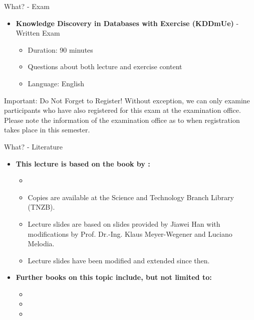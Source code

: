 \begin{frame}{What? - Exam}
	\begin{itemize}
		\item \textbf{Knowledge Discovery in Databases with Exercise (KDDmUe)} - {\color{faugray}Written Exam}
		      \begin{itemize}
			      \item Duration: 90 minutes
			      \item Questions about both lecture and exercise content
			      \item Language: English
		      \end{itemize}
	\end{itemize}
	\begin{alertblock}{Important: Do Not Forget to Register!}
		Without exception, we can only examine participants who have also registered for this exam at the examination office. Please note the information of the examination office as to when registration takes place in this semester.
	\end{alertblock}
\end{frame}

\begin{frame}{What? - Literature}
	\begin{itemize}
		\item \textbf{This lecture is based on the book by \citeauthor{han2011}:}
		      \begin{itemize}
			      \item {}
			      \item {\color{faugray}Copies are available at the Science and Technology Branch Library (TNZB).}
			      \item Lecture slides are based on slides provided by Jiawei Han with modifications by Prof. Dr.-Ing. Klaus Meyer-Wegener and Luciano Melodia.
			      \item Lecture slides have been modified and extended since then.
		      \end{itemize}
		\item \textbf{Further books on this topic include, but not limited to:}
		      \begin{itemize}
			      \item {}
			      \item {}
			      \item {}
		      \end{itemize}
	\end{itemize}
\end{frame}

